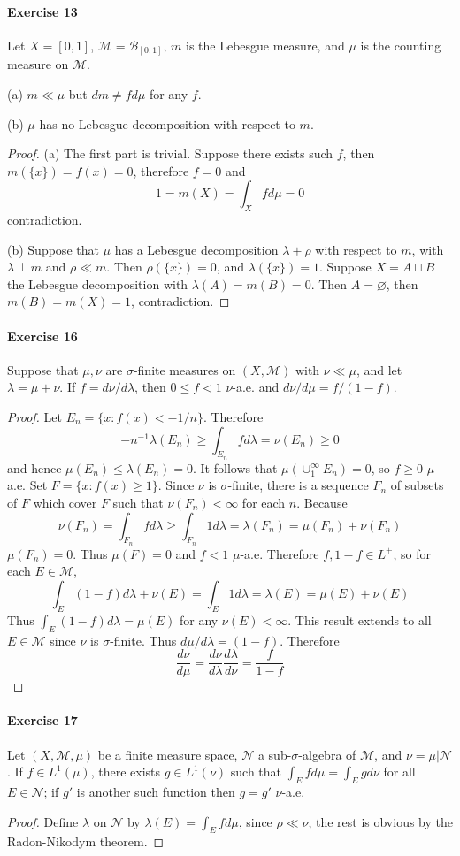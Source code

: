 \paragraph*{Exercise 13}
Let $X=[0,1]$, $\mathcal{M}=\mathcal{B}_{[0,1]}$, $m$ is the Lebesgue measure, and $\mu$ is the counting measure on $\mathcal{M}$.
\par(a) $m\ll\mu$ but $dm\neq fd\mu$ for any $f$.
\par(b) $\mu$ has no Lebesgue decomposition with respect to $m$.
\begin{proof}
    (a) The first part is trivial. Suppose there exists such $f$, then $m(\{x\})=f(x)=0$, therefore $f=0$ and
    $$
    1=m(X)=\int_Xfd\mu=0
    $$
    contradiction.
    \par (b) Suppose that $\mu$ has a Lebesgue decomposition $\lambda+\rho$ with respect to $m$, with $\lambda\perp m$ and $\rho\ll m$. Then $\rho(\{x\})=0$, and $\lambda(\{x\})=1$. Suppose $X=A\sqcup B$ the Lebesgue decomposition with $\lambda(A)=m(B)=0$. Then $A=\varnothing$, then $m(B)=m(X)=1$, contradiction.
\end{proof}
\paragraph*{Exercise 16}
Suppose that $\mu,\nu$ are $\sigma$-finite measures on $(X,\mathcal{M})$ with $\nu\ll\mu$, and let $\lambda=\mu+\nu$. If $f=d\nu/d\lambda$, then $0\le f<1$ $\nu$-a.e. and $d\nu/d\mu=f/(1-f)$.
\begin{proof}
    Let $E_n=\{x:f(x)<-1/n\}$. Therefore
    $$
    -n^{-1}\lambda(E_n)\ge\int_{E_n}fd\lambda=\nu(E_n)\ge 0
    $$
    and hence $\mu(E_n)\le\lambda(E_n)=0$. It follows that $\mu(\cup^\infty_1E_n)=0$, so $f\ge 0$ $\mu$-a.e. Set $F=\{x:f(x)\ge 1\}$. Since $\nu$ is $\sigma$-finite, there is a sequence $F_n$ of subsets of $F$ which cover $F$ such that $\nu(F_n)<\infty$ for each $n$. Because
    $$
    \nu(F_n)=\int_{F_n}fd\lambda\ge\int_{F_n}1d\lambda=\lambda(F_n)=\mu(F_n)+\nu(F_n)
    $$
    $\mu(F_n)=0$. Thus $\mu(F)=0$ and $f<1$ $\mu$-a.e. Therefore $f,1-f\in L^+$, so for each $E\in\mathcal{M}$,
    $$
    \int_E(1-f)d\lambda+\nu(E)=\int_E1d\lambda=\lambda(E)=\mu(E)+\nu(E)
    $$
    Thus $\int_E(1-f)d\lambda=\mu(E)$ for any $\nu(E)<\infty$. This result extends to all $E\in\mathcal{M}$ since $\nu$ is $\sigma$-finite. Thus $d\mu/d\lambda=(1-f)$. Therefore
    $$
    \dfrac{d\nu}{d\mu}=\dfrac{d\nu}{d\lambda}\dfrac{d\lambda}{d\nu}=\dfrac{f}{1-f}
    $$
\end{proof}
\paragraph*{Exercise 17}
Let $(X,\mathcal{M},\mu)$ be a finite measure space, $\mathcal{N}$ a sub-$\sigma$-algebra of $\mathcal{M}$, and $\nu=\mu|\mathcal{N}$. If $f\in L^1(\mu)$, there exists $g\in L^1(\nu)$ such that $\int_Efd\mu=\int_Egd\nu$ for all $E\in\mathcal{N}$; if $g'$ is another such function then $g=g'$ $\nu$-a.e.
\begin{proof}
    Define $\lambda$ on $\mathcal{N}$ by $\lambda(E)=\int_Efd\mu$, since $\rho\ll\nu$, the rest is obvious by the Radon-Nikodym theorem.
\end{proof}